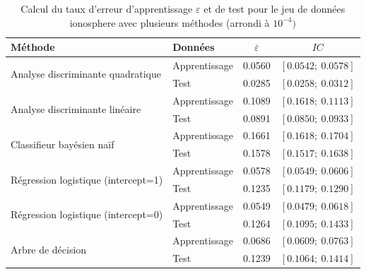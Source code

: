 \documentclass[a4paper,11pt,oneside,roman]{article}
\begin{document}
\begin{table}[H]
\centering

\begin{tabular}{l|l|cc}
\multicolumn{1}{l|}{\textbf{Méthode}}    & \textbf{Données} &$ \overline{\varepsilon}$ & $IC$                      \\ \hline
\multirow{2}{*}{Analyse discriminante quadratique} & Apprentissage    &  0.0560                   & $\left[0.0542 ;~ 0.0578 \right]$  \\
                                       & Test             &  0.0285             & $\left[0.0258 ;~ 0.0312 \right]$ \\ \hline
\multirow{2}{*}{Analyse discriminante linéaire}                  & Apprentissage & 0.1089                                 & $\left[0.1618 ;~ 0.1113 \right]$  \\
                                       & Test             & 0.0891                       & $\left[0.0850  ;~ 0.0933 \right]$ \\ \hline
\multirow{2}{*}{Classifieur bayésien naïf}                  & Apprentissage    & 0.1661                             & $\left[0.1618 ;~ 0.1704 \right]$  \\
                                       & Test             & 0.1578                                 & $\left[0.1517 ;~ 0.1638 \right]$ \\ \hline
\multirow{2}{*}{Régression logistique (intercept=1)}                  & Apprentissage    & 0.0578                             & $\left[0.0549 ;~ 0.0606 \right]$  \\
                                       & Test             & 0.1235                                 & $\left[0.1179;~ 0.1290 \right]$ \\ \hline
\multirow{2}{*}{Régression logistique (intercept=0)}                  & Apprentissage    & 0.0549                           & $\left[0.0479 ;~ 0.0618 \right]$  \\
                                       & Test             & 0.1264                                & $\left[0.1095 ;~ 0.1433 \right]$ \\ \hline
\multirow{2}{*}{Arbre de décision}                  & Apprentissage    & 0.0686                             & $\left[0.0609 ;~  0.0763 \right]$  \\
                                       & Test             & 0.1239                                 & $\left[0.1064 ;~ 0.1414 \right]$ 
\end{tabular}

\caption{Calcul du taux d'erreur d'apprentissage $\varepsilon$ et de test pour le jeu de données ionosphere avec plusieurs méthodes (arrondi à $10^{-4})$}
\label{ionosphere}
\end{table}
\end{document}
